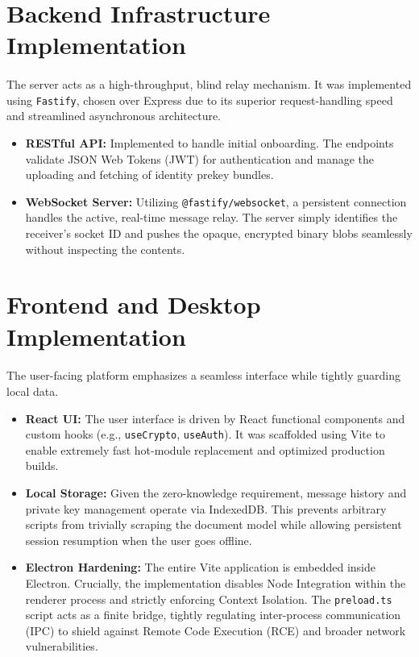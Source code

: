 \section{Backend Infrastructure Implementation}
\paragraph{}
The server acts as a high-throughput, blind relay mechanism. It was implemented using \texttt{Fastify}, chosen over Express due to its superior request-handling speed and streamlined asynchronous architecture.
\begin{itemize}
    \item \textbf{RESTful API:} Implemented to handle initial onboarding. The endpoints validate JSON Web Tokens (JWT) for authentication and manage the uploading and fetching of identity prekey bundles.
    \item \textbf{WebSocket Server:} Utilizing \texttt{@fastify/websocket}, a persistent connection handles the active, real-time message relay. The server simply identifies the receiver's socket ID and pushes the opaque, encrypted binary blobs seamlessly without inspecting the contents.
\end{itemize}

\section{Frontend and Desktop Implementation}
\paragraph{}
The user-facing platform emphasizes a seamless interface while tightly guarding local data. 
\begin{itemize}
    \item \textbf{React UI:} The user interface is driven by React functional components and custom hooks (e.g., \texttt{useCrypto}, \texttt{useAuth}). It was scaffolded using Vite to enable extremely fast hot-module replacement and optimized production builds. 
    \item \textbf{Local Storage:} Given the zero-knowledge requirement, message history and private key management operate via IndexedDB. This prevents arbitrary scripts from trivially scraping the document model while allowing persistent session resumption when the user goes offline.
    \item \textbf{Electron Hardening:} The entire Vite application is embedded inside Electron. Crucially, the implementation disables Node Integration within the renderer process and strictly enforcing Context Isolation. The \texttt{preload.ts} script acts as a finite bridge, tightly regulating inter-process communication (IPC) to shield against Remote Code Execution (RCE) and broader network vulnerabilities.
\end{itemize}
